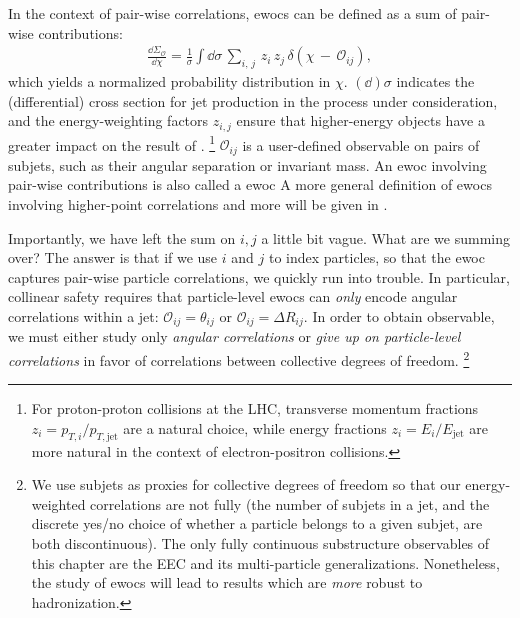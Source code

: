 In the context of pair-wise correlations, \glspl{ewoc} can be defined as a sum of pair-wise contributions:
\begin{align}
    \label{eq:intro_ewoc_def}
    \frac{\dd \Sigma_\mathcal{O}}{\dd \chi}
    =
    \frac{1}{\sigma}
    \int \dd\sigma \,
    \sum_{
        i,\, j
    } \,
    z_i \, z_j \,
    \delta\left(\chi \, - \, \mathcal{O}_{ij}\right)
    ,
\end{align}
which yields a normalized probability distribution in \(\chi\).
%
\((\dd)\sigma\) indicates the (differential) cross section for jet production in the process under consideration, and the energy-weighting factors \(z_{i,j}\) ensure that higher-energy objects have a greater impact on the result of .%
\footnote{
    For proton-proton collisions at the LHC, transverse momentum fractions \(z_i = p_{T,i}/p_{T,\text{jet}}\) are a natural choice, while energy fractions \(z_{i} = E_{i}/E_\text{jet}\) are more natural in the context of electron-positron collisions.
}
%
\(\mathcal{O}_{ij}\) is a user-defined  observable on pairs of subjets, such as their angular separation or invariant mass.
%
An \gls{ewoc} involving pair-wise contributions is also called a  \gls{ewoc}
%
A more general definition of \glspl{ewoc} involving higher-point correlations and more will be given in .

Importantly, we have left the sum on \(i,j\) a little bit vague.
%
What are we summing over?
%
The answer is that if we use \(i\) and \(j\) to index particles, so that the \gls{ewoc} captures pair-wise particle correlations, we quickly run into trouble.
%
In particular, collinear safety requires that particle-level \glspl{ewoc} can \textit{only} encode angular correlations within a jet:
%
\(\mathcal{O}_{ij} = \theta_{ij}\) or \(\mathcal{O}_{ij} = \Delta R_{ij}\).
%
In order to obtain  observable, we must either study only \textit{angular correlations} or \textit{give up on particle-level correlations} in favor of correlations between collective degrees of freedom.%
\footnote{
    We use subjets as proxies for collective degrees of freedom so that our energy-weighted correlations are not fully  (the number of subjets in a jet, and the discrete yes/no choice of whether a particle belongs to a given subjet, are both discontinuous).
    The only fully continuous substructure observables of this chapter are the EEC and its multi-particle generalizations.
    Nonetheless, the study of \glspl{ewoc} will lead to results which are \textit{more} robust to hadronization.
}


